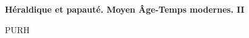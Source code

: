 \documentclass[12pt,twoside,openany]{book}
\title{\PURHBookTitle}
\author{\PURHBookAuthor}
\date{\PURHYear}
\newcommand{\PURHBookTitle}{Héraldique et papauté. Moyen Âge-Temps modernes. II}
\newcommand{\PurhTitleExtra}[1]{%
  {\small #1\par}%
}
\begin{document}
\begin{titlepage}
\thispagestyle{empty}
\centering
\vspace*{0.15\textheight}
{\Huge\bfseries \PURHBookTitle\par}
\vfill
\PurhTitleExtra{PURH}
\end{titlepage}
\clearpage



\cleardoublepage

\tableofcontents
\end{document}
